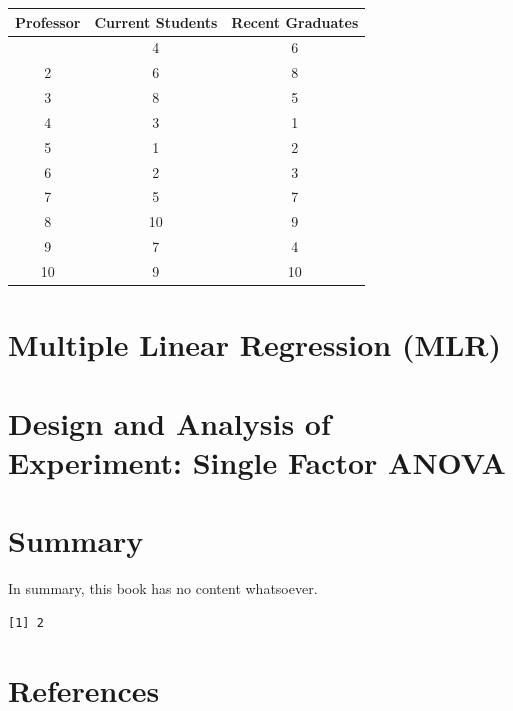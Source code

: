 \documentclass[
  11pt,
  letterpaper,
  DIV=11,
  numbers=noendperiod]{scrreprt}
\begin{document}
\begin{longtable}[]{@{}ccc@{}}
\toprule\noalign{}
Professor & Current Students & Recent Graduates \\
\midrule\noalign{}
\endhead
\bottomrule\noalign{}
\endlastfoot
1 & 4 & 6 \\
2 & 6 & 8 \\
3 & 8 & 5 \\
4 & 3 & 1 \\
5 & 1 & 2 \\
6 & 2 & 3 \\
7 & 5 & 7 \\
8 & 10 & 9 \\
9 & 7 & 4 \\
10 & 9 & 10 \\
\end{longtable}


\chapter{Multiple Linear Regression
(MLR)}\label{multiple-linear-regression-mlr}


\chapter{Design and Analysis of Experiment: Single Factor
ANOVA}\label{design-and-analysis-of-experiment-single-factor-anova}


\chapter{Summary}\label{summary}

In summary, this book has no content whatsoever.

\begin{verbatim}
[1] 2
\end{verbatim}


\chapter*{References}\label{references}

\end{document}
